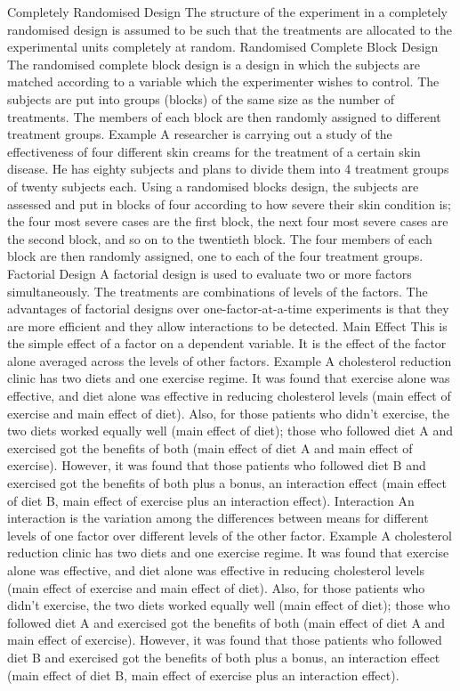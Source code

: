Completely Randomised Design 
The structure of the experiment in a completely randomised design is assumed to be such that the treatments are allocated to the experimental units completely at random.
Randomised Complete Block Design 
The randomised complete block design is a design in which the subjects are matched according to a variable which the experimenter wishes to control. The subjects are put into groups (blocks) of the same size as the number of treatments. The members of each block are then randomly assigned to different treatment groups.
Example 
A researcher is carrying out a study of the effectiveness of four different skin creams for the treatment of a certain skin disease. He has eighty subjects and plans to divide them into 4 treatment groups of twenty subjects each. Using a randomised blocks design, the subjects are assessed and put in blocks of four according to how severe their skin condition is; the four most severe cases are the first block, the next four most severe cases are the second block, and so on to the twentieth block. The four members of each block are then randomly assigned, one to each of the four treatment groups.
Factorial Design 
A factorial design is used to evaluate two or more factors simultaneously. The treatments are combinations of levels of the factors. The advantages of factorial designs over one-factor-at-a-time experiments is that they are more efficient and they allow interactions to be detected.
Main Effect 
This is the simple effect of a factor on a dependent variable. It is the effect of the factor alone averaged across the levels of other factors.
Example 
A cholesterol reduction clinic has two diets and one exercise regime. It was found that exercise alone was effective, and diet alone was effective in reducing cholesterol levels (main effect of exercise and main effect of diet). Also, for those patients who didn't exercise, the two diets worked equally well (main effect of diet); those who followed diet A and exercised got the benefits of both (main effect of diet A and main effect of exercise). However, it was found that those patients who followed diet B and exercised got the benefits of both plus a bonus, an interaction effect (main effect of diet B, main effect of exercise plus an interaction effect).
Interaction 
An interaction is the variation among the differences between means for different levels of one factor over different levels of the other factor.
Example 
A cholesterol reduction clinic has two diets and one exercise regime. It was found that exercise alone was effective, and diet alone was effective in reducing cholesterol levels (main effect of exercise and main effect of diet). Also, for those patients who didn't exercise, the two diets worked equally well (main effect of diet); those who followed diet A and exercised got the benefits of both (main effect of diet A and main effect of exercise). However, it was found that those patients who followed diet B and exercised got the benefits of both plus a bonus, an interaction effect (main effect of diet B, main effect of exercise plus an interaction effect).
